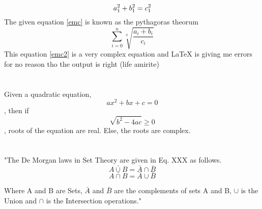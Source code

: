 \documentclass[a4paper,12ptx]{article}
\begin{document}
	\section{}
	\begin{equation}
	\label{emc}
		a_1^2 + b_1^2 = c_1^2
		\newline
	\end{equation}
	The given equation \ref{emc} is known as the pythagoras theorum
	\begin{equation}
		\label{emc2}
			\sum_{i=0}^{n}\sqrt[3]{\frac{a_i + b_i}{c_i}}
	\end{equation}
	This equation \ref{emc2} is a very complex equation and LaTeX is giving me errors for no reason tho the output is right (life amirite)
	\newline
	\section{}
	Given a quadratic equation,$$ax^2 + bx + c = 0$$, then if $$\sqrt{b^2 - 4ac} \geq 0$$, roots of the equation are real. Else, the roots are complex.
	\section{}
	"The De Morgan laws in Set Theory are given in Eq. XXX as follows.
	$$\bar{A \cup B} = \bar{A} \cap \bar{B}$$
	$$\bar{A \cap B} = \bar{A} \cup \bar{B}$$
	
	Where A and B are Sets, $\bar{A}$ and $\bar{B}$ are the complements of sets A and B, $\cup$ is the Union and $\cap$ is the Intersection operations."
	
\end{document}
